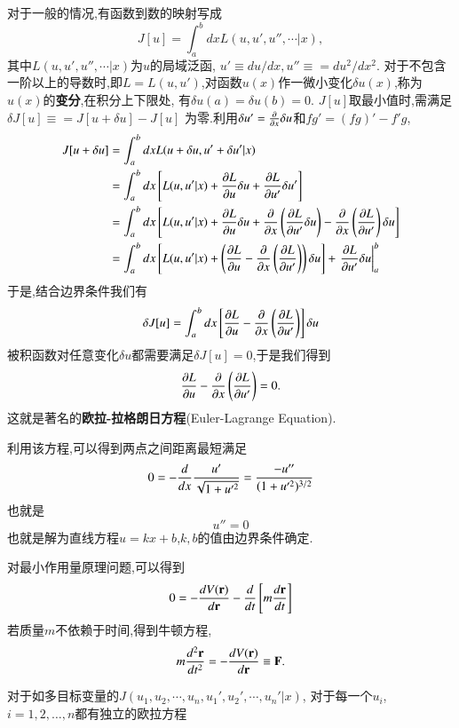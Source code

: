 对于一般的情况,有函数到数的映射写成
\begin{equation}
  J[u] = \int_{a}^{b}  dx L(u, u', u'', \cdots| x), 
\end{equation}
其中$L(u, u', u'',\cdots | x)$为$u$的局域泛函, $u' \equiv du/dx, u'' \equiv = du^2/dx^2$.
对于不包含一阶以上的导数时,即$L = L(u,u')$,对函数$u(x)$作一微小变化$\delta u(x)$,称为$u(x)$的\textbf{变分},在积分上下限处,
有$\delta u(a) = \delta u(b) = 0$. $J[u]$取最小值时,需满足$\delta J[u] \equiv = J[u + \delta u] - J[u]$
为零.利用$\delta u' = \frac{\partial{}}{\partial{x}} \delta u$和$fg' = (fg)' - f'g$,
\begin{align}
  J[u + \delta u] &= \int_{a}^{b}  dx L(u + \delta u, u' + \delta u'| x) 
    \nonumber \\ 
    &= \int_{a}^{b} dx \left[ L(u, u'| x) + \funcpd{L}{u} \delta u + \funcpd{L}{u'} \delta u' \right]  
    \nonumber \\ 
    &= \int_{a}^{b} dx \left[ L(u, u'| x) + \funcpd{L}{u} \delta u + \funcpd{}{x}\left( \funcpd{L}{u'} \delta u \right)
    -  \funcpd{}{x}\left( \funcpd{L}{u'} \right) \delta u  \right]  
    \nonumber \\ 
    &= \int_{a}^{b} dx \left[ L(u, u'| x) + \left( \funcpd{L}{u} -  \funcpd{}{x}\left( \funcpd{L}{u'} \right)   \right) \delta u \right]  
        + \left. \funcpd{L}{u'} \delta u \right|_{a}^{b} 
     \nonumber %
\end{align}
于是,结合边界条件我们有
\begin{align}
  \delta J[u] = \int_{a}^{b} dx \left[ \frac{\partial{L}}{\partial{u}} -  \frac{\partial{}}{\partial{x}}\left( \frac{\partial{L}}{\partial{u'}} \right)   \right] \delta u 
\end{align}
被积函数对任意变化$\delta u$都需要满足$\delta J[u] = 0$,于是我们得到
\begin{equation}
  \frac{\partial{L}}{\partial{u}} -  \frac{\partial{}}{\partial{x}}\left( \frac{\partial{L}}{\partial{u'}} \right) = 0 .
\end{equation}
这就是著名的\textbf{欧拉-拉格朗日方程}(Euler-Lagrange Equation).

利用该方程,可以得到两点之间距离最短满足
$$
  0 = - \frac{d{}}{d{x}} \frac{u'}{\sqrt{1 + u'^2}} = \frac{-u''}{(1+ u'^2)^{3/2}}
$$
也就是
$$ u'' = 0$$
也就是解为直线方程$ u = k x + b$,$k,b$的值由边界条件确定.

对最小作用量原理问题,可以得到
$$
  0 = - \frac{d{V({\mathbf{r}})}}{d{{\mathbf{r}}}} - \frac{d{}}{d{t}} \left[ m \frac{d{\mathbf{r}}}{dt} \right]
$$
若质量$m$不依赖于时间,得到牛顿方程,
$$
  m \frac{d^2{\mathbf{r}}}{dt^2} = - \frac{d{V({\mathbf{r}})}}{d{{\mathbf{r}}}} \equiv {\mathbf{F}} .
$$

对于如多目标变量的$J(u_1, u_2, \cdots, u_n, u_1', u_2', \cdots, u_n'|x)$, 对于每一个$u_i$, $i=1,2,\dots,n$都有独立的欧拉方程

